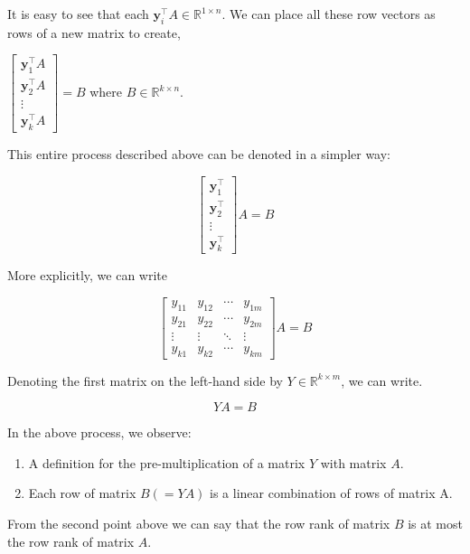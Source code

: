 \documentclass[a4paper]{article}
\begin{document}
It is easy to see that each $\boldsymbol{y}_i^{\top}A \in \mathbb{R}^{1 \times n}$. We can place all these row vectors as rows of a new matrix to create,

$\begin{bmatrix}
\boldsymbol{y}_1^{\top}A \\
\boldsymbol{y}_2^{\top}A \\
\vdots \\
\boldsymbol{y}_k^{\top}A
\end{bmatrix} = B$ where $B \in \mathbb{R}^{k \times n}$.

This entire process described above can be denoted in a simpler way:

\begin{equation}
\begin{bmatrix}
\boldsymbol{y}_1^{\top} \\
\boldsymbol{y}_2^{\top} \\
\vdots \\
\boldsymbol{y}_k^{\top}
\end{bmatrix}A = B
\end{equation}

More explicitly, we can write

\begin{equation}
\begin{bmatrix}
y_{11} & y_{12} & \cdots & y_{1m} \\
y_{21} & y_{22} & \cdots & y_{2m} \\
\vdots & \vdots & \ddots & \vdots \\
y_{k1} & y_{k2} & \cdots & y_{km}
\end{bmatrix}A = B
\end{equation}


Denoting the first matrix on the left-hand side by $Y \in \mathbb{R}^{k \times m}$, we can write.

\begin{equation}
YA = B
\end{equation}

In the above process, we observe:

\begin{enumerate}
\item A definition for the pre-multiplication of a matrix $Y$ with matrix $A$.
\item Each row of matrix $B (=YA)$ is a linear combination of rows of matrix A.
\end{enumerate}

From the second point above we can say that the row rank of matrix $B$ is at most the row rank of matrix $A$.
\end{document}

